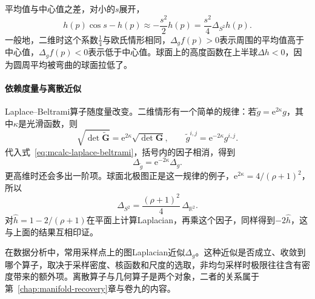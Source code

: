 平均值与中心值之差，对小的$s$展开，
\[
h(p)\cos s-h(p)\approx-\frac{s^2}2h(p)=\frac{s^2}4\Delta_{S^2}h(p).
\]
一般地，二维时这个系数$\tfrac14$与欧氏情形相同，$\Delta_gf(p)>0$表示周围的平均值高于中心值，$\Delta_gf(p)<0$表示低于中心值。球面上的高度函数在上半球$\Delta h<0$，因为圆周平均被弯曲的球面拉低了。

\paragraph{依赖度量与离散近似}
Laplace--Beltrami算子随度量改变。二维情形有一个简单的规律：若$\tilde g=\mathrm e^{2\kappa}g$，其中$\kappa$是光滑函数，则
\[
\sqrt{\det\widetilde{\bm G}}=\mathrm e^{2\kappa}\sqrt{\det\bm G},\qquad\tilde g^{i,j}=\mathrm e^{-2\kappa}g^{i,j}.
\]
代入式~\eqref{eq:mcalc-laplace-beltrami}，括号内的因子相消，得到
\[
\Delta_{\tilde g}=\mathrm e^{-2\kappa}\Delta_g .
\]
更高维时还会多出一阶项。球面北极图正是这一规律的例子，$\mathrm e^{2\kappa}=4/(\rho+1)^2$，所以
\[
\Delta_{S^2}=\frac{(\rho+1)^2}4\,\Delta_{\mathbb R^2}.
\]
对$\hat h=1-2/(\rho+1)$在平面上计算Laplacian，再乘这个因子，同样得到$-2\hat h$，这与上面的结果互相印证。

在数据分析中，常用采样点上的图Laplacian近似$\Delta_g$。这种近似是否成立、收敛到哪个算子，取决于采样密度、核函数和尺度的选取，非均匀采样时极限往往含有密度带来的额外项。离散算子与几何算子是两个对象，二者的关系属于第~\ref{chap:manifold-recovery}章与卷九的内容。
